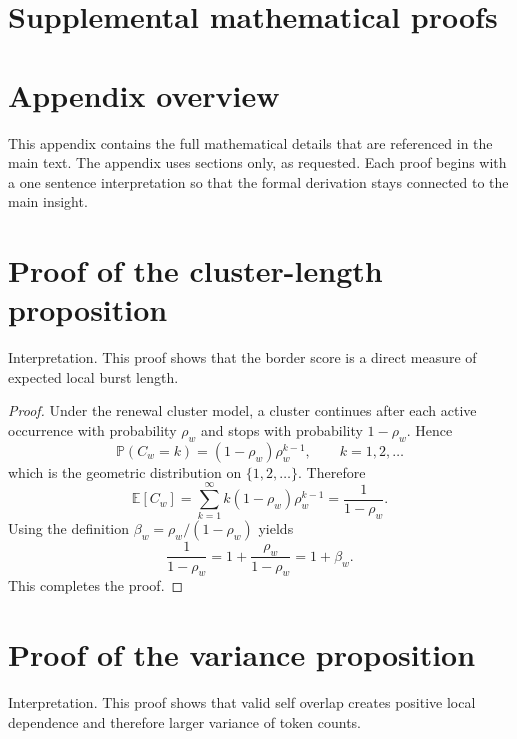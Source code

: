 \documentclass[12pt,letterpaper]{article}
\begin{document}
\section*{Supplemental mathematical proofs}

\section*{Appendix overview}

This appendix contains the full mathematical details that are referenced in the main text. The appendix uses sections only, as requested. Each proof begins with a one sentence interpretation so that the formal derivation stays connected to the main insight.

\section*{Proof of the cluster-length proposition}\label{app:proofcluster}

Interpretation. This proof shows that the border score is a direct measure of expected local burst length.

\begin{proof}
Under the renewal cluster model, a cluster continues after each active occurrence with probability $\rho_w$ and stops with probability $1-\rho_w$. Hence
\begin{equation}
\mathbb{P}(C_w = k) = (1-\rho_w)\rho_w^{k-1},
\qquad k = 1,2,\ldots
\label{eq:appgeom}
\end{equation}
which is the geometric distribution on $\{1,2,\ldots\}$. Therefore
\begin{equation}
\mathbb{E}[C_w]
=
\sum_{k=1}^{\infty} k (1-\rho_w)\rho_w^{k-1}
=
\frac{1}{1-\rho_w}.
\label{eq:appgeommean}
\end{equation}
Using the definition $\beta_w=\rho_w/(1-\rho_w)$ yields
\begin{equation}
\frac{1}{1-\rho_w} = 1 + \frac{\rho_w}{1-\rho_w} = 1+\beta_w.
\label{eq:appbetaidentity}
\end{equation}
This completes the proof.
\end{proof}

\section*{Proof of the variance proposition}\label{app:proofvariance}

Interpretation. This proof shows that valid self overlap creates positive local dependence and therefore larger variance of token counts.
\end{document}
